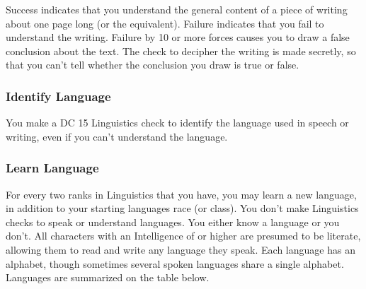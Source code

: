 Success indicates that you understand the general content of a piece of writing about one page long (or the equivalent). Failure indicates that you fail to understand the writing. Failure by 10 or more forces causes you to draw a false conclusion about the text. The check to decipher the writing is made secretly, so that you can't tell whether the conclusion you draw is true or false.

\subsubsection{Identify Language}
You make a DC 15 Linguistics check to identify the language used in speech or writing, even if you can't understand the language.

\subsubsection{Learn Language}
For every two ranks in Linguistics that you have, you may learn a new language, in addition to your starting languages race (or class). You don't make Linguistics checks to speak or understand languages. You either know a language or you don't. All characters with an Intelligence of  or higher are presumed to be literate, allowing them to read and write any language they speak. Each language has an alphabet, though sometimes several spoken languages share a single alphabet. Languages are summarized on the table below.

